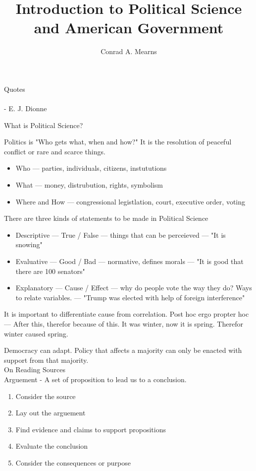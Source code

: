 \documentclass{article}
\title{Introduction to Political Science and American Government}
\author{Conrad A. Mearns}
\begin{document}
\maketitle

\noindent
\Large Quotes\\\\
\normalsize
{} - E. J. Dionne

\noindent
\Large
What is Political Science?
\normalsize

\noindent
Politics is "Who gets what, when and how?" It is the resolution of peaceful conflict or rare and scarce things.
\begin{itemize}
  \item Who --- parties, individuals, citizens, instututions
  \item What --- money, distrubution, rights, symbolism
  \item Where and How --- congressional legistlation, court, executive order, voting
\end{itemize}

\noindent
There are three kinds of statements to be made in Political Science
\begin{itemize}
  \item Descriptive --- True / False --- things that can be perceieved --- "It is snowing"
  \item Evaluative --- Good / Bad --- normative, defines morals --- "It is good that there are 100 senators"
  \item Explanatory --- Cause / Effect --- why do people vote the way they do? Ways to relate variables. --- "Trump was elected with help of foreign interference"
\end{itemize}

\noindent
It is important to differentiate cause from correlation. Post hoc ergo propter hoc --- After this, therefor because of this. It was winter, now it is spring. Therefor winter caused spring.

\noindent
Democracy can adapt. Policy that affects a majority can only be enacted with support from that majority.\\

\noindent
\Large
On Reading Sources\\
\normalsize
\noindent
Arguement - A set of proposition to lead us to a conclusion.

\begin{enumerate}
  \item Consider the source
  \item Lay out the arguement
  \item Find evidence and claims to support propositions
  \item Evaluate the conclusion
  \item Consider the consequences or purpose
\end{enumerate}
\end{document}
